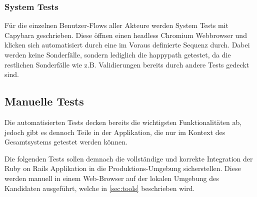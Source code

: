\subsubsection{System Tests}
Für die einzelnen Benutzer-Flows aller Akteure werden System Tests mit Capybara geschrieben.
Diese öffnen einen headless Chromium Webbrowser und klicken sich automatisiert durch eine im Voraus definierte Sequenz durch.
Dabei werden keine Sonderfälle, sondern lediglich die \gls{happypath} getestet, da die restlichen Sonderfälle wie z.B. Validierungen bereits durch andere Tests gedeckt sind.

\newpage

\subsection{Manuelle Tests}

Die automatisierten Tests decken bereits die wichtigsten Funktionalitäten ab,
jedoch gibt es dennoch Teile in der Applikation, die nur im Kontext des Gesamtsystems getestet werden können.

Die folgenden Tests sollen demnach die vollständige und korrekte Integration der Ruby on Rails Applikation in die Produktions-Umgebung sicherstellen.
Diese werden manuell in einem Web-Browser auf der lokalen Umgebung des Kandidaten ausgeführt, welche in \ref{sec:tools} beschrieben wird.


